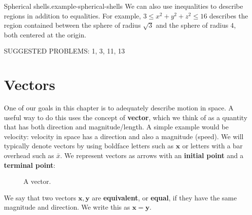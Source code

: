 \documentclass[10pt,]{book}
\newcommand{\terminology}[1]{\textbf{#1}}
\numberwithin{equation}{section}
\newcommand{\vv}[1]{\mathbf{#1}}
\begin{document}
\begin{example}{Spherical shells.}{example-spherical-shells}%
\hypertarget{p-1080}{}%
We can also use inequalities to describe regions in addition to equalities. For example, \(3\leq x^{2}+y^{2}+z^{2}\leq 16\) describes the region contained between the sphere of radius \(\sqrt{3}\) and the sphere of radius \(4\), both centered at the origin.%
\end{example}
\hypertarget{p-1081}{}%
SUGGESTED PROBLEMS: 1, 3, 11, 13%
%
%
\typeout{************************************************}
\typeout{************************************************}
%
\section[{Vectors}]{Vectors}\label{section-vectors}
\begin{introduction}{}%
\hypertarget{p-1082}{}%
One of our goals in this chapter is to adequately describe motion in space. A useful way to do this uses the concept of \terminology{vector}, which we think of as a quantity that has both direction and magnitude/length. A simple example would be velocity: velocity in space has a direction and also a magnitude (speed). We will typically denote vectors by using boldface letters such as \(\vv{x}\) or letters with a bar overhead such as \(\bar{x}\). We represent vectors as arrows with an \terminology{initial point} and a \terminology{terminal point}:%
\begin{figure}
\centering
{
}
\caption{A vector.\label{figure-vector-representation}}
\end{figure}
\hypertarget{p-1083}{}%
We say that two vectors \(\vv{x},\vv{y}\) are \terminology{equivalent}, or \terminology{equal}, if they have the same magnitude and direction. We write this as \(\vv{x} = \vv{y}\).%
\end{introduction}%
%
%
\typeout{************************************************}
\typeout{************************************************}
%
\end{document}

